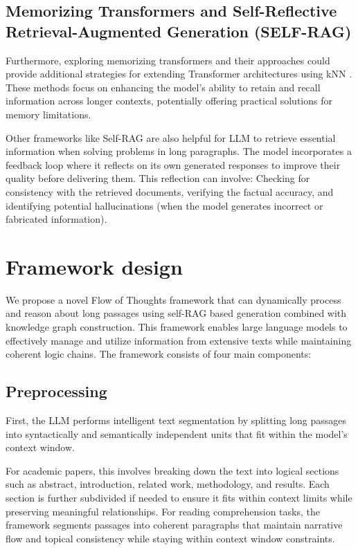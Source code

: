 \documentclass{article}
\begin{document}
\subsection{Memorizing Transformers and Self-Reflective Retrieval-Augmented Generation (SELF-RAG)}

Furthermore, exploring memorizing transformers and their approaches could provide additional strategies for extending Transformer architectures using kNN \cite{wu2022memorizingtransformers}. These methods focus on enhancing the model’s ability to retain and recall information across longer contexts, potentially offering practical solutions for memory limitations.

Other frameworks like Self-RAG \cite{asai2023selfraglearningretrievegenerate} are also helpful for LLM to retrieve essential information when solving problems in long paragraphs. The model incorporates a feedback loop where it reflects on its own generated responses to improve their quality before delivering them. This reflection can involve: Checking for consistency with the retrieved documents, verifying the factual accuracy, and identifying potential hallucinations (when the model generates incorrect or fabricated information).

\section{Framework design}

We propose a novel Flow of Thoughts framework that can dynamically process and reason about long passages using self-RAG based generation combined with knowledge graph construction. This framework enables large language models to effectively manage and utilize information from extensive texts while maintaining coherent logic chains. The framework consists of four main components:

\subsection{Preprocessing}

First, the LLM performs intelligent text segmentation by splitting long passages into syntactically and semantically independent units that fit within the model's context window. 

For academic papers, this involves breaking down the text into logical sections such as abstract, introduction, related work, methodology, and results. Each section is further subdivided if needed to ensure it fits within context limits while preserving meaningful relationships. For reading comprehension tasks, the framework segments passages into coherent paragraphs that maintain narrative flow and topical consistency while staying within context window constraints.
\end{document}
